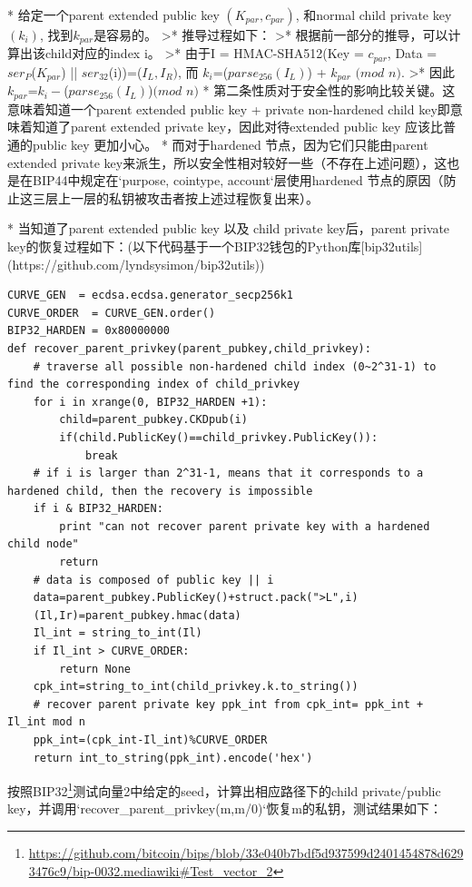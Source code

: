 \documentclass{article}
\begin{document}
* 给定一个parent extended public key $(K_{par},c_{par})$, 和normal child private key $(k_i)$, 找到$k_{par}$是容易的。
>* 推导过程如下：
>* 根据前一部分的推导，可以计算出该child对应的index i。  
>* 由于I = HMAC-SHA512(Key = $c_{par}$, Data = $ser_P$($K_{par}$) || $ser_{32}$(i))=($I_L,I_R)$, 而 $k_i$=($parse_{256}(I_L)$) + $k_{par}$ $(mod$ $n)$.   
>* 因此 $k_{par}$=$k_i-$($parse_{256}(I_L)$)$(mod$ $n)$    
* 第二条性质对于安全性的影响比较关键。这意味着知道一个parent extended public key + private non-hardened child key即意味着知道了parent extended private key，因此对待extended public key 应该比普通的public key 更加小心。
* 而对于hardened 节点，因为它们只能由parent extended private key来派生，所以安全性相对较好一些（不存在上述问题），这也是在BIP44中规定在`purpose, cointype, account`层使用hardened 节点的原因（防止这三层上一层的私钥被攻击者按上述过程恢复出来）。

* 当知道了parent extended public key 以及 child private key后，parent private key的恢复过程如下：(以下代码基于一个BIP32钱包的Python库[bip32utils](https://github.com/lyndsysimon/bip32utils))

\begin{lstlisting}
CURVE_GEN  = ecdsa.ecdsa.generator_secp256k1
CURVE_ORDER  = CURVE_GEN.order()
BIP32_HARDEN = 0x80000000 
def recover_parent_privkey(parent_pubkey,child_privkey):
	# traverse all possible non-hardened child index (0~2^31-1) to find the corresponding index of child_privkey
	for i in xrange(0, BIP32_HARDEN +1):
		child=parent_pubkey.CKDpub(i)
		if(child.PublicKey()==child_privkey.PublicKey()):
			break
    # if i is larger than 2^31-1, means that it corresponds to a hardened child, then the recovery is impossible
	if i & BIP32_HARDEN:
		print "can not recover parent private key with a hardened child node"
		return
	# data is composed of public key || i
	data=parent_pubkey.PublicKey()+struct.pack(">L",i)
	(Il,Ir)=parent_pubkey.hmac(data)
	Il_int = string_to_int(Il)
	if Il_int > CURVE_ORDER:
	    return None
	cpk_int=string_to_int(child_privkey.k.to_string())
	# recover parent private key ppk_int from cpk_int= ppk_int + Il_int mod n
	ppk_int=(cpk_int-Il_int)%CURVE_ORDER
	return int_to_string(ppk_int).encode('hex')
\end{lstlisting}

按照BIP32\footnote{\url{https://github.com/bitcoin/bips/blob/33e040b7bdf5d937599d2401454878d6293476c9/bip-0032.mediawiki\#Test_vector_2}}测试向量2中给定的seed，计算出相应路径下的child private/public key，并调用`recover_parent_privkey(m,m/0)`恢复m的私钥，测试结果如下：
\end{document}
